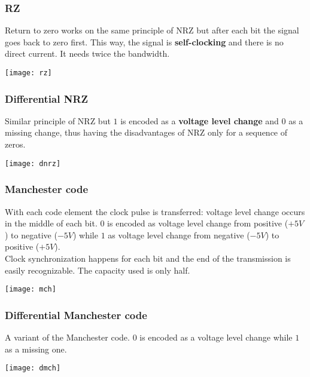 \subsubsection{RZ}
Return to zero works on the same principle of NRZ but after each bit the signal goes back to zero first. This way, the signal is \textbf{self-clocking} and there is no direct current. It needs twice the bandwidth.
\begin{center}
	\texttt{[image: rz]}
\end{center}

\subsubsection{Differential NRZ}
Similar principle of NRZ but $1$ is encoded as a \textbf{voltage level change} and $0$ as a missing change, thus having the disadvantages of NRZ only for a sequence of zeros.
\begin{center}
	\texttt{[image: dnrz]}
\end{center}

\subsubsection{Manchester code}
With each code element the clock pulse is transferred: voltage level change occurs in the middle of each bit. $0$ is encoded as voltage level change from positive ($+5V$) to negative ($-5V$) while $1$ as voltage level change from negative ($-5V$) to positive ($+5V$).\\
Clock synchronization happens for each bit and the end of the transmission is easily recognizable. The capacity used is only half.
\begin{center}
	\texttt{[image: mch]}
\end{center}

\subsubsection{Differential Manchester code}
A variant of the Manchester code. $0$ is encoded as a voltage level change while $1$ as a missing one.
\begin{center}
	\texttt{[image: dmch]}
\end{center}

